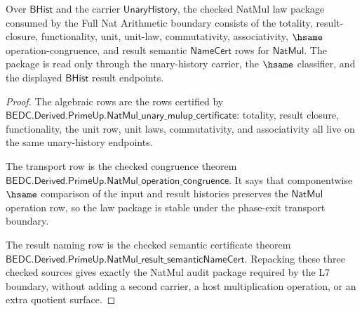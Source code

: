 \begin{theorem}
\label{thm:mulup-checked-law-audit-package}
Over $\mathsf{BHist}$ and the carrier $\mathsf{UnaryHistory}$, the checked
NatMul law package consumed by the Full Nat Arithmetic boundary consists of the
totality, result-closure, functionality, unit, unit-law, commutativity,
associativity, $\hsame$ operation-congruence, and result semantic
$\mathsf{NameCert}$ rows for $\mathsf{NatMul}$. The package is read only through
the unary-history carrier, the $\hsame$ classifier, and the displayed
$\mathsf{BHist}$ result endpoints.
\end{theorem}
\begin{proof}
The algebraic rows are the rows certified by
$\mathsf{BEDC.Derived.PrimeUp.NatMul\_unary\_mulup\_certificate}$: totality,
result closure, functionality, the unit row, unit laws, commutativity, and
associativity all live on the same unary-history endpoints.

The transport row is the checked congruence theorem
$\mathsf{BEDC.Derived.PrimeUp.NatMul\_operation\_congruence}$. It says that
componentwise $\hsame$ comparison of the input and result histories preserves
the $\mathsf{NatMul}$ operation row, so the law package is stable under the
phase-exit transport boundary.

The result naming row is the checked semantic certificate theorem
$\mathsf{BEDC.Derived.PrimeUp.NatMul\_result\_semanticNameCert}$. Repacking
these three checked sources gives exactly the NatMul audit package required by
the L7 boundary, without adding a second carrier, a host multiplication
operation, or an extra quotient surface.
\end{proof}

